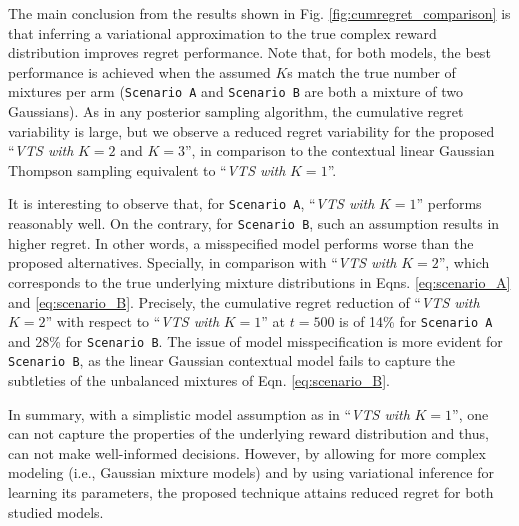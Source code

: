 \documentclass{article}
\newcommand{\ie}{i.e., }
\begin{document}
The main conclusion from the results shown in Fig. \ref{fig:cumregret_comparison} is that inferring a variational approximation to the true complex reward distribution improves regret performance. Note that, for both models, the best performance is achieved when the assumed $K$s match the true number of mixtures per arm (\texttt{Scenario A} and \texttt{Scenario B} are both a mixture of two Gaussians). As in any posterior sampling algorithm, the cumulative regret variability is large, but we observe a reduced regret variability for the proposed ``\textit{VTS with }$K=2$ and $K=3$'', in comparison to the contextual linear Gaussian Thompson sampling equivalent to ``\textit{VTS with }$K=1$''.

It is interesting to observe that, for \texttt{Scenario A}, ``\textit{VTS with }$K=1$'' performs reasonably well. On the contrary, for \texttt{Scenario B}, such an assumption results in higher regret. In other words, a misspecified model performs worse than the proposed alternatives. Specially, in comparison with ``\textit{VTS with }$K=2$'', which corresponds to the true underlying mixture distributions in Eqns. \ref{eq:scenario_A} and \ref{eq:scenario_B}. Precisely, the cumulative regret reduction of ``\textit{VTS with }$K=2$'' with respect to ``\textit{VTS with }$K=1$'' at $t=500$ is of 14\% for \texttt{Scenario A} and 28\% for \texttt{Scenario B}.
The issue of model misspecification is more evident for \texttt{Scenario B}, as the linear Gaussian contextual model fails to capture the subtleties of the unbalanced mixtures of Eqn. \ref{eq:scenario_B}.

In summary, with a simplistic model assumption as in ``\textit{VTS with }$K=1$'', one can not capture the properties of the underlying reward distribution and thus, can not make well-informed decisions. However, by allowing for more complex modeling (\ie Gaussian mixture models) and by using variational inference for learning its parameters, the proposed technique attains reduced regret for both studied models.
\end{document}
